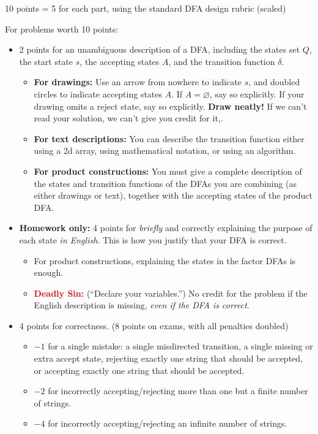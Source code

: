 \documentclass[11pt]{article}
\begin{document}
\begin{enumerate}
\begin{rubric}
10 points = 5 for each part, using the standard DFA design rubric (scaled)
\end{rubric}


\vfil

\begin{rubric}
For problems worth 10 points:
\begin{itemize}
\item
2 points for an unambiguous description of a DFA, including the states set $Q$, the start state $s$, the accepting states $A$, and the transition function $\delta$.
\begin{itemize}
\item 
\textbf{For drawings:} Use an arrow from nowhere to indicate $s$, and doubled circles to indicate accepting states $A$.  If $A=\varnothing$, say so explicitly.  If your drawing omits a reject state, say so explicitly.  \textbf{Draw neatly!}  If we can't read your solution, we can't give you credit for it,.

\item
\textbf{For text descriptions:} You can describe the transition function either using a 2d array, using mathematical notation, or using an algorithm.

\item
\textbf{For product constructions:} You must give a complete description of the states and transition functions of the DFAs you are combining (as either drawings or text), together with the accepting states of the product DFA.

\end{itemize}

\item
\textbf{Homework only:}
4 points for \emph{briefly} and correctly explaining the purpose of each state \emph{in English}.  This is how you justify that your DFA is correct.
\begin{itemize}
\item 
For product constructions, explaining the states in the factor DFAs is enough.
\item
\textcolor{Red}{\textbf{Deadly Sin:}} (“Declare your variables.”) No credit for the problem if the English description is missing, \emph{even if the DFA is correct}.
\end{itemize}


\item 
4 points for correctness.  (8 points on exams, with all penalties doubled)
\begin{itemize}\itemsep0pt
\item $-1$ for a single mistake: a single misdirected transition, a single missing or extra accept state, rejecting exactly one string that should be accepted, or accepting exactly one string that should be accepted. 
\item
$-2$ for incorrectly accepting/rejecting more than one but a finite number of strings.
\item
$-4$ for incorrectly accepting/rejecting an infinite number of strings.
\end{itemize}


\end{itemize}
\end{rubric}
\end{enumerate}
\end{document}
